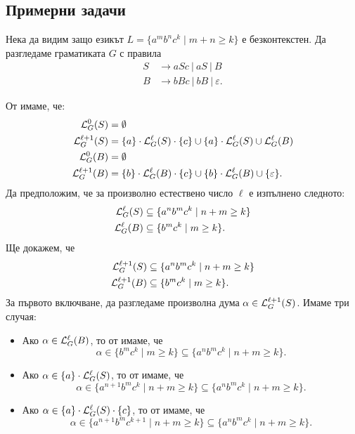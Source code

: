 \subsection{Примерни задачи}

\begin{extra}
  \begin{example}
  Нека да видим защо езикът $L = \{a^mb^nc^k\mid m+n \geq k\}$ е безконтекстен.
  Да разгледаме граматиката $G$ с правила
  \begin{align*}
    S& \rightarrow aSc\ |\ aS\ |\ B\\
    B& \rightarrow bBc\ |\  bB\ |\ \varepsilon.
  \end{align*}

  От  имаме, че:
  \begin{align*}
    \mathcal{L}^0_G(S) & = \emptyset\\
    \mathcal{L}^{\ell+1}_G(S) & = \{a\} \cdot \mathcal{L}^\ell_G(S) \cdot \{c\} \cup \{a\}\cdot \mathcal{L}^\ell_G(S) \cup \mathcal{L}^\ell_G(B)\\
    \mathcal{L}^0_G(B) & = \emptyset\\
    \mathcal{L}^{\ell+1}_G(B) & = \{b\} \cdot \mathcal{L}^\ell_G(B) \cdot \{c\} \cup \{b\} \cdot \mathcal{L}^\ell_G(B) \cup \{\varepsilon\}.
  \end{align*}
  Да предположим, че за произволно естествено число $\ell$ е изпълнено следното:
  \begin{align}
    \mathcal{L}^\ell_G(S) & \subseteq \{a^nb^mc^k \mid n+m \geq k\} \\
    \mathcal{L}^\ell_G(B)  & \subseteq \{ b^mc^k \mid m \geq k\}. 
  \end{align}
  Ще докажем, че
  \begin{align*}
    \mathcal{L}^{\ell+1}_G(S) & \subseteq \{a^nb^mc^k \mid n+m \geq k\}\\
    \mathcal{L}^{\ell+1}_G(B)  & \subseteq \{ b^mc^k \mid m \geq k\}.
  \end{align*}
  За първото включване, да разгледаме произволна дума $\alpha \in \mathcal{L}^{\ell+1}_G(S)$. Имаме три случая:
  \begin{itemize}
  \item
    Ако $\alpha \in \mathcal{L}^\ell_G(B)$, то от \IndHyp имаме, че
    \[\alpha \in \{b^mc^k \mid m \geq k\} \subseteq \{a^nb^mc^k \mid n+m \geq k\}.\]
  \item
    Ако $\alpha \in \{a\} \cdot \mathcal{L}^{\ell}_G(S)$, то от \IndHyp имаме, че
    \[\alpha \in \{a^{n+1}b^mc^k \mid n+m \geq k\} \subseteq \{a^nb^mc^k \mid n+m \geq k\}.\]
  \item
    Ако $\alpha \in \{a\} \cdot \mathcal{L}^{\ell}_G(S) \cdot \{c\}$, то от \IndHyp имаме, че
    \[\alpha \in \{a^{n+1}b^mc^{k+1} \mid n+m \geq k\} \subseteq \{a^nb^mc^k \mid n+m \geq k\}.\]
  \end{itemize}


\end{example}
\end{extra}
